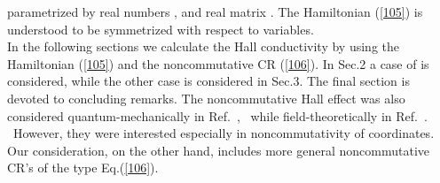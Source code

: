 \documentclass[a4paper,seceq]{ptptex}
\providecommand{\bfg}{ \boldsymbol{g} }
\begin{document}
parametrized by real numbers \coordHE{},\coordHE{} 
and real \coordHE{}  matrix \myHighlight{$\bfg $}\coordHE{}.
The Hamiltonian (\ref{105}) is understood to be symmetrized
with respect to variables. \\
\indent
In the following sections we calculate the Hall conductivity
by using the Hamiltonian (\ref{105}) and
the noncommutative CR (\ref{106}).
In Sec.2 a case of \coordHE{} is considered,
while the other case  \coordHE{} is considered in Sec.3.
The final section is devoted to concluding remarks.
The noncommutative Hall effect was also considered
quantum-mechanically
in Ref.~, \ while field-theoretically
in Ref.~. \ However, they were interested especially
in noncommutativity of coordinates.
Our consideration, on the other hand,
includes more general noncommutative CR's of the type Eq.(\ref{106}).
\end{document}
